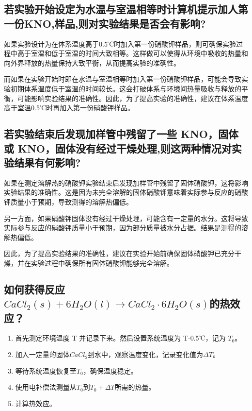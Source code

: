 \documentclass[UTF8]{ctexart}
\begin{document}
\subsection{若实验开始设定为水温与室温相等时计算机提示加人第一份KNO,样品,则对实验结果是否会有影响?}
如果实验设计为在体系温度高于0.5℃时加入第一份硝酸钾样品，则可确保实验过程中高于室温和低于室温的时间大致相等。这样做可以使得从环境中吸收的热量和向外界释放的热量保持大致平衡，从而提高实验的准确性。

而如果在实验开始时即在水温与室温相等时加入第一份硝酸钾样品，可能会导致实验初期体系温度低于室温的时间较长。这会打破体系与环境间热量吸收与释放的平衡，可能影响实验结果的准确性。因此，为了提高实验的准确性，建议在体系温度高于室温0.5℃时再加入第一份硝酸钾样品。
\subsection{若实验结束后发现加样管中残留了一些 KNO，固体或 KNO，固体没有经过干燥处理,则这两种情况对实验结果有何影响?}
如果在测定溶解热的硝酸钾实验结束后发现加样管中残留了固体硝酸钾，这将影响实验结果的准确性。这是因为未完全溶解的固体硝酸钾意味着实际参与反应的硝酸钾质量小于预期，导致测得的溶解热偏低。

另一方面，如果硝酸钾固体没有经过干燥处理，可能含有一定量的水分。这将导致实际参与反应的硝酸钾质量小于预期，因为部分质量被水分占据。结果是测得的溶解热偏低。

因此，为了提高实验结果的准确性，建议在实验开始前确保固体硝酸钾已充分干燥，并在实验过程中确保所有固体硝酸钾能够完全溶解。
\subsection{如何获得反应 $CaCl_2(s)+6H_2O(l)\rightarrow CaCl_2\cdot 6H_2O(s)$的热效应？}
\begin{enumerate}
    \item 首先测定环境温度 T 并记录下来。然后设置系统温度为 T-0.5℃，记为 $T_0$。
    \item 加入一定量的固体$CaCl_2$到水中，观察温度变化，记录变化值为$\Delta T$。
    \item 等待系统温度恢复至$T_0$，确保温度稳定。
    \item 使用电补偿法测量从$T_0$到$T_0+\Delta T$所需的热量。
    \item 计算热效应。
    
\end{enumerate}
\end{document}
